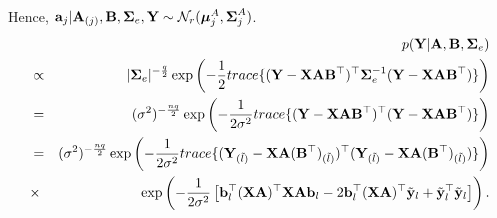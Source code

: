 \documentclass[]{book}
\begin{document}
Hence, \({\bf a}_j|{\bf A}_{(j)},{\bf B},{\boldsymbol \Sigma}_e,{\bf Y}\sim \mathcal{N}_r({\boldsymbol \mu}_j^A,{\boldsymbol \Sigma}_j^A)\).
\begin{eqnarray*}
        &&p({\bf Y}|{\bf A},{\bf B},{\boldsymbol \Sigma}_e)\\
        &\propto& |{\boldsymbol \Sigma}_e|^{-\frac{q}{2}}\exp\left(-\frac{1}{2}trace\{
        ({\bf Y}-{\bf X}{\bf A}{\bf B}^{{\top}})^{{\top}}{\boldsymbol \Sigma}_e^{-1}({\bf Y}-{\bf X}{\bf A}{\bf B}^{{\top}})\}\right)\\
        &=& (\sigma^2)^{-\frac{nq}{2}}\exp\left(-\frac{1}{2\sigma^2}trace\{
        ({\bf Y}-{\bf X}{\bf A}{\bf B}^{{\top}})^{{\top}}({\bf Y}-{\bf X}{\bf A}{\bf B}^{{\top}})\}\right)\\
        &=&(\sigma^2)^{-\frac{nq}{2}}\exp\left(-\frac{1}{2\sigma^2}trace\{({\bf Y}_{(\tilde{l})}
        -{\bf X}{\bf A}({\bf B}^{{\top}})_{(\tilde{l})})^{{\top}}({\bf Y}_{(\tilde{l})}-{\bf X}{\bf A}({\bf B}^{{\top}})_{(\tilde{l})})\}\right)\\
        &\times& \exp\left(-\frac{1}{2\sigma^2}\left[{\bf b}_{l}^{{\top}} ({\bf X}{\bf A})^{{\top}}{\bf X}{\bf A}{\bf b}_{l}-
        2{\bf b}_{l}^{{\top}}({\bf X}{\bf A})^{{\top}}\tilde{{\bf y}}_l+\tilde{{\bf y}}_l^{{\top}}\tilde{{\bf y}}_l\right]\right).
\end{eqnarray*}
\end{document}
